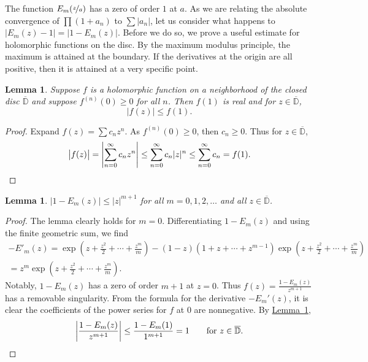 \documentclass[12pt,openany]{book}
\newcommand{\sabs}[1]{\lvert {#1} \rvert}
\newcommand{\babs}[1]{\bigl\lvert {#1} \bigr\rvert}
\newcommand{\abs}[1]{\left\lvert {#1} \right\rvert}
\newcommand{\D}{{\mathbb{D}}}
\theoremstyle{plain}
\newtheorem{lemma}[thm]{Lemma}
\theoremstyle{remark}
\theoremstyle{definition}
\theoremstyle{exercise}
\theoremstyle{example}
\newcommand{\lemmaref}[1]{\hyperref[#1]{Lemma~\ref*{#1}}}
\begin{document}
The function $E_m(\nicefrac{z}{a})$ has a zero of order $1$ at $a$.
As we are relating the absolute convergence of $\prod (1+a_n)$ to $\sum
\sabs{a_n}$, let us consider what happens to $\babs{E_m(z)-1}=\babs{1-E_m(z)}$.
Before we do so, we prove a useful estimate for holomorphic functions
on the disc.
By the maximum modulus principle, the maximum is attained at the boundary.
If the derivatives at the origin are all positive, then it is attained
at a very specific point.

\begin{lemma} \label{lemma:maxprincpositive}
Suppose $f$ is a holomorphic function on a neighborhood of the closed
disc $\overline{\D}$ and suppose $f^{(n)}(0) \geq 0$ for all $n$.
Then $f(1)$ is real and for $z \in \overline{\D}$,
\begin{equation*}
\babs{f(z)} \leq f(1) .
\end{equation*}
\end{lemma}

\begin{proof}
Expand $f(z) = \sum c_n z^n$.  As $f^{(n)}(0) \geq 0$,
then $c_n \geq 0$.
Thus for $z \in \overline{\D}$,
\begin{equation*}
\babs{f(z)} =
\abs{\sum_{n=0}^\infty c_n z^n}
\leq
\sum_{n=0}^\infty c_n \sabs{z}^n
\leq
\sum_{n=0}^\infty c_n = f(1) .  \qedhere
\end{equation*}
\end{proof}

\begin{lemma} \label{lemma:elemfactbound}
$\sabs{1-E_m(z)} \leq \sabs{z}^{m+1}$ for all $m = 0,1,2,\ldots$ and all 
$z \in \overline{\D}$.
\end{lemma}

\begin{proof}
The lemma clearly holds for $m=0$.
Differentiating $1-E_m(z)$ and using the finite geometric sum, we find
\begin{multline*}
-E'_m(z) =
\exp\left( z +\frac{z^2}{2} + \cdots + \frac{z^m}{m} \right)
-
(1-z) (1 +z  + \cdots + z^{m-1} ) \exp\left( z +\frac{z^2}{2} + \cdots + \frac{z^m}{m} \right)
\\
=
z^m \exp\left( z +\frac{z^2}{2} + \cdots + \frac{z^m}{m} \right) .
\end{multline*}
Notably, $1-E_m(z)$ has a zero of order $m+1$ at $z=0$.  Thus $f(z) =
\frac{1-E_m(z)}{z^{m+1}}$ has a removable singularity.  From the formula for
the derivative $-E_m'(z)$, it is clear the coefficients of the power series
for $f$ at $0$ are nonnegative.  By \lemmaref{lemma:maxprincpositive},
\begin{equation*}
\abs{\frac{1-E_m(z)}{z^{m+1}}} \leq
\frac{1-E_m(1)}{1^{m+1}} = 1
\qquad \text{for $z \in \overline{\D}$}.  \qedhere
\end{equation*}
\end{proof}
\end{document}
